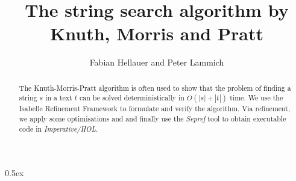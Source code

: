 \documentclass[11pt,a4paper]{article}
\begin{document}
\title{The string search algorithm by Knuth, Morris and Pratt}
\author{Fabian Hellauer and Peter Lammich}
\maketitle

\begin{abstract}
The Knuth-Morris-Pratt algorithm\cite{KMP77} is often used to show that the problem of finding 
a string $s$ in a text $t$ can be solved deterministically in $O(|s| + |t|)$ time. 
We use the Isabelle Refinement Framework\cite{Refine_Monadic-AFP} to formulate and verify 
the algorithm. Via refinement, we apply some optimisations and and finally
use the \textit{Sepref} tool\cite{Refine_Imperative_HOL-AFP} to obtain executable 
code in \textit{Imperative/HOL}.
\end{abstract}

\tableofcontents
\clearpage

\parindent 0pt\parskip 0.5ex





\end{document}
